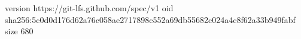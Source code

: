 version https://git-lfs.github.com/spec/v1
oid sha256:5c0d0d176d62a76c058ae2717898c552a69db55682c024a4c8f62a33b949fabf
size 680
